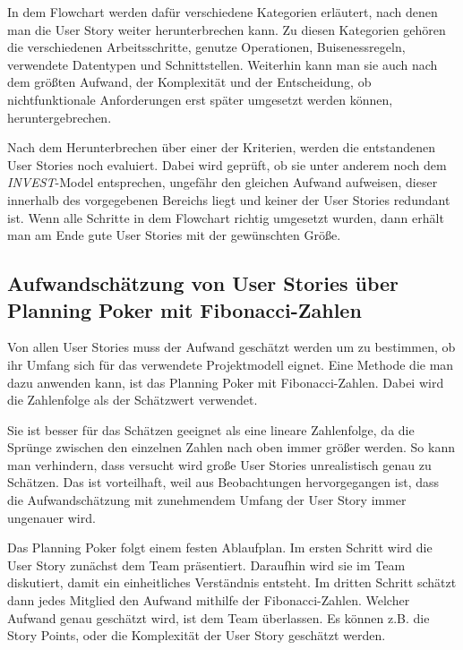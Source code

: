 \documentclass[acmtog]{acmart}
\begin{document}
In dem Flowchart werden dafür verschiedene Kategorien erläutert, nach denen man die User Story weiter herunterbrechen kann. Zu diesen Kategorien
gehören die verschiedenen Arbeitsschritte, genutze Operationen, Buisenessregeln, verwendete Datentypen und Schnittstellen. Weiterhin kann man sie auch nach dem größten
Aufwand, der Komplexität und der Entscheidung, ob nichtfunktionale Anforderungen erst später umgesetzt werden können, heruntergebrechen. \cite{humanizingwork}

Nach dem Herunterbrechen über einer der Kriterien, werden die entstandenen User Stories noch evaluiert. Dabei wird geprüft, ob sie
unter anderem noch dem \emph{INVEST}-Model entsprechen, ungefähr den gleichen Aufwand aufweisen, dieser innerhalb des vorgegebenen Bereichs liegt und
keiner der User Stories redundant ist. Wenn alle Schritte in dem Flowchart richtig umgesetzt wurden, dann erhält man am Ende gute User Stories mit der
gewünschten Größe. \cite{humanizingwork}

\subsection{Aufwandschätzung von User Stories über Planning Poker mit Fibonacci-Zahlen} \label{sec:effort}

Von allen User Stories muss der Aufwand geschätzt werden um zu bestimmen, ob ihr Umfang sich für das verwendete Projektmodell eignet.
Eine Methode die man dazu anwenden kann, ist das Planning Poker mit Fibonacci-Zahlen. Dabei wird die Zahlenfolge als der Schätzwert verwendet. \cite{planingpoker}

Sie ist besser für das Schätzen geeignet als eine lineare Zahlenfolge, da die Sprünge zwischen den einzelnen Zahlen nach oben immer größer werden. So kann man
verhindern, dass versucht wird große User Stories unrealistisch genau zu Schätzen. Das ist vorteilhaft, weil aus Beobachtungen hervorgegangen ist, dass
die Aufwandschätzung mit zunehmendem Umfang der User Story immer ungenauer wird. \cite{planingpoker}

Das Planning Poker folgt einem festen Ablaufplan. Im ersten Schritt wird die User Story zunächst dem Team präsentiert. Daraufhin wird sie im Team diskutiert,
damit ein einheitliches Verständnis entsteht. Im dritten Schritt schätzt dann jedes Mitglied den Aufwand mithilfe der Fibonacci-Zahlen. Welcher Aufwand genau
geschätzt wird, ist dem Team überlassen. Es können z.B. die Story Points, oder die Komplexität der User Story geschätzt werden. \cite{planingpoker}
\end{document}
